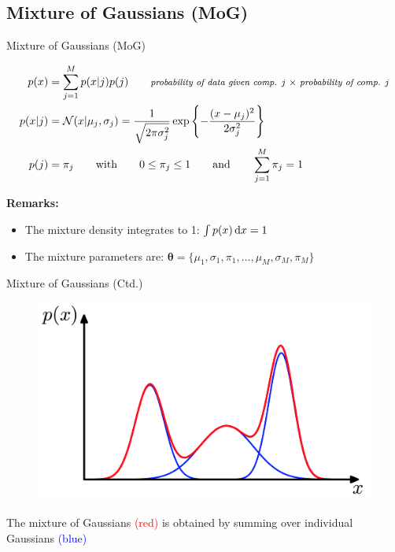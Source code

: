 \subsection{Mixture of Gaussians (MoG)}

\begin{frame}{Mixture of Gaussians (MoG)}{}\important
	\vspace*{-3mm}
	{\footnotesize
	\begin{align}
		p(x) 
			&= \sum_{j=1}^M p(x \vert j) p(j) \qquad\text{\footnotesize \textit{probability of data given comp. $j$ $\times$ probability of comp. $j$}} \\
		p(x|j)
			&= \mathcal{N}(x \vert \mu_j, \sigma_j) = \frac{1}{\sqrt{2 \pi\sigma_j^2}} \exp \left\{ -\frac{(x - \mu_j)^2}{2\sigma_j^2} \right\} \\
		p(j) 
			&= \pi_j \qquad\text{with}\qquad 0 \le \pi_j \le 1 \qquad\text{and}\qquad \sum_{j=1}^M \pi_j = 1
	\end{align}
	
	\vspace*{-3mm}
	\textbf{Remarks:}
	\begin{itemize}
		\item The mixture density integrates to 1: $\int p(x) \mathop{}\!\mathrm{d} x = 1$
		\item The mixture parameters are: $\bm{\theta} = \{ \mu_1, \sigma_1, \pi_1, \dots, \mu_M, \sigma_M, \pi_M \}$
	\end{itemize}}
\end{frame}


\begin{frame}{Mixture of Gaussians (Ctd.)}{}
	\begin{figure}
		\centering
		\includegraphics[scale=0.4]{04_density_estimation/02_img/gaussian_mixture}
	\end{figure}
	\vspace*{-2mm}
	\footnotesize The mixture of Gaussians \textcolor{red}{(red)} is obtained by summing over individual Gaussians \textcolor{blue}{(blue)}
\end{frame}


